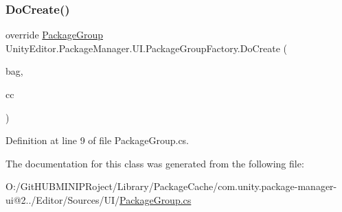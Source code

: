 \subsubsection{\texorpdfstring{DoCreate()}{DoCreate()}}
{\footnotesize\ttfamily override \mbox{\hyperlink{class_unity_editor_1_1_package_manager_1_1_u_i_1_1_package_group}{Package\+Group}} Unity\+Editor.\+Package\+Manager.\+U\+I.\+Package\+Group\+Factory.\+Do\+Create (\begin{DoxyParamCaption}\item[{I\+Uxml\+Attributes}]{bag,  }\item[{Creation\+Context}]{cc }\end{DoxyParamCaption})\hspace{0.3cm}{\ttfamily [protected]}}



Definition at line 9 of file Package\+Group.\+cs.



The documentation for this class was generated from the following file\+:\begin{DoxyCompactItemize}
\item 
O\+:/\+Git\+H\+U\+B\+M\+I\+N\+I\+P\+Roject/\+Library/\+Package\+Cache/com.\+unity.\+package-\/manager-\/ui@2../\+Editor/\+Sources/\+U\+I/\mbox{\hyperlink{_package_group_8cs}{Package\+Group.\+cs}}\end{DoxyCompactItemize}
